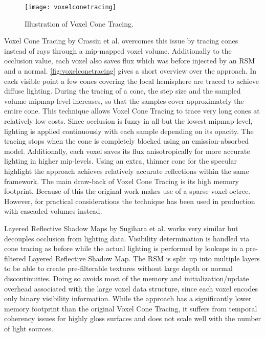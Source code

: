 \documentclass[thesis.tex]{subfiles}
\begin{document}
\begin{figure}[h]
\centering
\texttt{[image: voxelconetracing]}
\caption{\cite{bib:voxelconetracing} Illustration of Voxel Cone Tracing. } \label{fig:voxelconetracing}
\end{figure}
Voxel Cone Tracing by Crassin et al. \cite{bib:voxelconetracing} overcomes this issue by tracing cones instead of rays through a mip-mapped voxel volume.
Additionally to the occlusion value, each voxel also saves flux which was before injected by an RSM and a normal.
\autoref{fig:voxelconetracing} gives a short overview over the approach.
In each visible point a few cones covering the local hemisphere are traced to achieve diffuse lighting.
During the tracing of a cone, the step size and the sampled volume-mipmap-level increases, so that the samples cover approximately the entire cone.
This technique allows Voxel Cone Tracing to trace very long cones at relatively low costs.
Since occlusion is fuzzy in all but the lowest mipmap-level, lighting is applied continuously with each sample depending on its opacity.
The tracing stops when the cone is completely blocked using an emission-absorbed model.
Additionally, each voxel saves its flux anisotropically for more accurate lighting in higher mip-levels.
Using an extra, thinner cone for the specular highlight the approach achieves relatively accurate reflections within the same framework.
The main draw-back of Voxel Cone Tracing is its high memory footprint.
Because of this the original work makes use of a sparse voxel octree.
However, for practical considerations the technique has been used in production with cascaded volumes instead. 

Layered Reflective Shadow Maps by Sugihara et al. \cite{bib:layeredrsm} works very similar but decouples occlusion from lighting data.
Visibility determination is handled via cone tracing as before while the actual lighting is performed by lookups in a pre-filtered Layered Reflective Shadow Map.
The RSM is split up into multiple layers to be able to create pre-filterable textures without large depth or normal discontinuities.
Doing so avoids most of the memory and initialization/update overhead associated with the large voxel data structure, since each voxel encodes only binary visibility information.
While the approach has a significantly lower memory footprint than the original Voxel Cone Tracing, it suffers from temporal coherency issues for highly gloss surfaces and does not scale well with the number of light sources.
\end{document}
